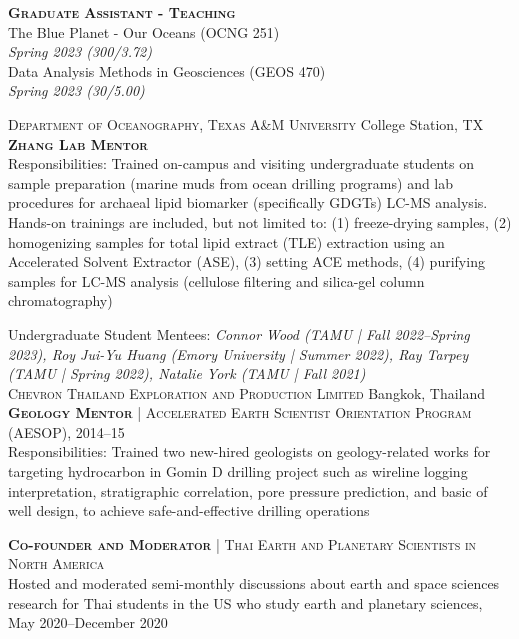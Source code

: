 \documentclass[10pt, letter]{article}
\newcommand{\margintext}[1]{\marginnote{\normalsize\textbf #1 |}}
\begin{document}
\bigskip
\textbf{\textsc{Graduate Assistant - Teaching}} \\
The Blue Planet - Our Oceans (OCNG 251) \\
\textit{Spring 2023 (300/3.72)} \\
Data Analysis Methods in Geosciences (GEOS 470) \\
\textit{Spring 2023 (30/5.00)}

\bigskip
\margintext{Mentoring}
\textsc{Department of Oceanography, Texas A\&M University} \hfill College Station, TX \\
\textsc{\textbf{Zhang Lab Mentor}}\\
\footnotesize 
{\color{gray} Responsibilities: Trained on-campus and visiting undergraduate students on sample preparation (marine muds from ocean drilling programs) and lab procedures for archaeal lipid biomarker (specifically GDGTs) LC-MS analysis. Hands-on trainings are included, but not limited to: (1) freeze-drying samples, (2) homogenizing samples for total lipid extract (TLE) extraction using an Accelerated Solvent Extractor (ASE), (3) setting ACE methods, (4) purifying samples for LC-MS analysis (cellulose filtering and silica-gel column chromatography)}

\normalsize
\bigskip
Undergraduate Student Mentees: \textit{Connor Wood (TAMU | Fall 2022–Spring 2023), Roy Jui-Yu Huang (Emory University | Summer 2022), Ray Tarpey (TAMU | Spring 2022), Natalie York (TAMU | Fall 2021)} \\

\textsc{Chevron Thailand Exploration and Production Limited} \hfill Bangkok, Thailand \\
\textsc{\textbf{Geology Mentor}} | \textsc{Accelerated Earth Scientist Orientation Program (AESOP)}, 2014–15 \\
\footnotesize 
{\color{gray} Responsibilities: Trained two new-hired geologists on geology-related works for targeting hydrocarbon in Gomin D drilling project such as wireline logging interpretation, stratigraphic correlation, pore pressure prediction, and basic of well design, to achieve safe-and-effective drilling operations}

\normalsize
\bigskip
\margintext{Leaderships}
\textsc{\textbf{Co-founder and Moderator}} | \textsc{Thai Earth and Planetary Scientists in North America} \\
Hosted and moderated semi-monthly discussions about earth and space sciences research for Thai students in the US who study earth and planetary sciences, May 2020–December 2020
\end{document}
